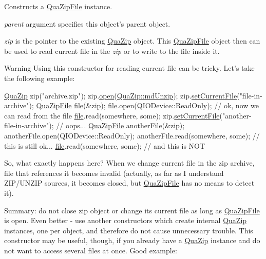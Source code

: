 Constructs a \hyperlink{class_qua_zip_file}{Qua\-Zip\-File} instance. 

{\itshape parent} argument specifies this object's parent object.

{\itshape zip} is the pointer to the existing \hyperlink{class_qua_zip}{Qua\-Zip} object. This \hyperlink{class_qua_zip_file}{Qua\-Zip\-File} object then can be used to read current file in the {\itshape zip} or to write to the file inside it.

\begin{DoxyWarning}{Warning}
Using this constructor for reading current file can be tricky. Let's take the following example\-: 
\begin{DoxyCode}
\hyperlink{class_qua_zip}{QuaZip} zip(\textcolor{stringliteral}{"archive.zip"});
zip.\hyperlink{class_qua_zip_abfa4e6018b2964a3d10a4c54e5ab3962}{open}(\hyperlink{class_qua_zip_a47e28d4116ee716fdd6b431b821d0be4a803a371910c2dc830d111e9ce5b58897}{QuaZip::mdUnzip});
zip.\hyperlink{class_qua_zip_a6c657bfcfccb59d728e0da24c677d899}{setCurrentFile}(\textcolor{stringliteral}{"file-in-archive"});
\hyperlink{class_qua_zip_file}{QuaZipFile} \hyperlink{sdlgamepad_8dox_a049a073e5602cc325f7559a06c5a2420}{file}(&zip);
\hyperlink{sdlgamepad_8dox_a049a073e5602cc325f7559a06c5a2420}{file}.open(QIODevice::ReadOnly);
\textcolor{comment}{// ok, now we can read from the file}
\hyperlink{sdlgamepad_8dox_a049a073e5602cc325f7559a06c5a2420}{file}.read(somewhere, some);
zip.\hyperlink{class_qua_zip_a6c657bfcfccb59d728e0da24c677d899}{setCurrentFile}(\textcolor{stringliteral}{"another-file-in-archive"}); \textcolor{comment}{// oops...}
\hyperlink{class_qua_zip_file}{QuaZipFile} anotherFile(&zip);
anotherFile.open(QIODevice::ReadOnly);
anotherFile.read(somewhere, some); \textcolor{comment}{// this is still ok...}
\hyperlink{sdlgamepad_8dox_a049a073e5602cc325f7559a06c5a2420}{file}.read(somewhere, some); \textcolor{comment}{// and this is NOT}
\end{DoxyCode}
 So, what exactly happens here? When we change current file in the {\ttfamily zip} archive, {\ttfamily file} that references it becomes invalid (actually, as far as I understand Z\-I\-P/\-U\-N\-Z\-I\-P sources, it becomes closed, but \hyperlink{class_qua_zip_file}{Qua\-Zip\-File} has no means to detect it).
\end{DoxyWarning}
Summary\-: do not close {\ttfamily zip} object or change its current file as long as \hyperlink{class_qua_zip_file}{Qua\-Zip\-File} is open. Even better -\/ use another constructors which create internal \hyperlink{class_qua_zip}{Qua\-Zip} instances, one per object, and therefore do not cause unnecessary trouble. This constructor may be useful, though, if you already have a \hyperlink{class_qua_zip}{Qua\-Zip} instance and do not want to access several files at once. Good example\-: 
